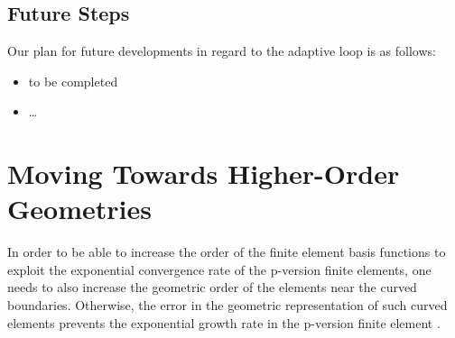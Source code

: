 \documentclass[review,12pt]{elsarticle_summary_report}
\begin{document}
\subsection{\label{adaptive_loop_future} Future Steps}

Our plan for future developments in regard to the adaptive loop is as follows:
\begin{itemize}
  \item to be completed
  \item \dots
\end{itemize}



\section{\label{high_order_geom}Moving Towards Higher-Order Geometries}

In order to be able to increase the order of the finite element basis functions to exploit the exponential convergence rate of the p-version finite elements, one needs to also increase the geometric order of the elements near the curved boundaries. Otherwise, the error in the geometric representation of such curved elements prevents the exponential growth rate in the p-version finite element \cite{LuoShephard_04, DeyShephard_97, LuoShephard_02}.
\end{document}
